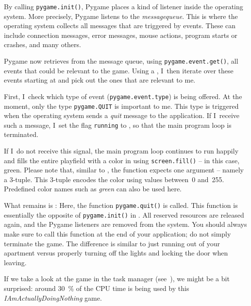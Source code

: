By calling \texttt{py\-game.\-init()}, Pygame places a kind of listener inside the operating system. More precisely, Pygame listens to the \emph{\gls{messagequeue}}. This is where the operating system collects all messages that are triggered by events. These can include  connection messages,  error messages, mouse actions, program starts or crashes, and many others.

Pygame now retrieves from the message queue, using \texttt{pygame.event.get()}, all events that could be relevant to the game. Using a \forSchleife, I~then iterate over these events starting at  and pick out the ones that are relevant to me.

First, I~check which type of event (\texttt{pygame.event.type})  is being offered.
At the moment, only the type \texttt{pygame.QUIT}  is important to me. This type is triggered when the operating system sends a \emph{quit} message to the application. If I~receive such a message, I~set the flag \texttt{running} to \false{}, so that the main program loop is terminated.

If I~do not receive this signal, the main program loop continues to run happily and fills the entire playfield with a color in  using \texttt{screen.fill()} -- in this case, green. Please note that, similar to , the function expects
one argument -- namely a 3-tuple. This 3-tuple encodes the color using  values between~0 and~255. Predefined color names such as \emph{green} can also be used here.


What remains is : Here, the function \texttt{pygame.quit()}
 is called. This function is essentially the opposite of \texttt{pygame.init()} in . All reserved resources are released again, and the Pygame listeners are removed from the system. You should always make sure to call this function at the end of your application; do not simply terminate the game. The difference is similar to just running out of your apartment versus properly turning off the lights and locking the door when leaving.

If we take a look at the game in the task manager (see~), we might be a bit surprised: around \SI{30}{\%} of the CPU time is being used by this \emph{IAmActuallyDoingNothing} game.


